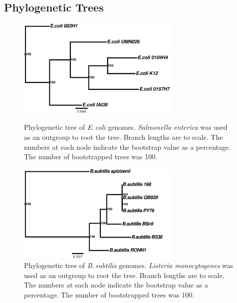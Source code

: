 \documentclass[11pt]{article}
\newcommand{\salm}{\textit{Salmonella enterica}\xspace}
\newcommand{\ecol}{\textit{E.\,coli}\xspace}
\newcommand{\lis}{\textit{Listeria monocytogenes}\xspace}
\newcommand{\bass}{\textit{B.\,subtilis}\xspace}
\begin{document}
	\subsection{Phylogenetic Trees}
	\begin{figure}[H]
		\begin{center}
			\includegraphics[width=0.7\textwidth]{./figs/ecoli_chrom_superseq_all_blocks_branchlengths_rooted_outtree.pdf}
			\caption{\label{fig:ecolitree} Phylogenetic tree of \ecol genomes. \salm was used as an outgroup to root the tree. Branch lengths are to scale. The numbers at each node indicate the bootstrap value as a percentage. The number of bootstrapped trees was 100.}
		\end{center}
	\vspace*{\floatsep}%
	
		\begin{center}
			\includegraphics[width=0.7\textwidth]{./figs/bacillus_chrom_superseq_all_blocks_branchlengths_rooted_outtree.pdf}
			\caption{\label{fig:basstree} Phylogenetic tree of \bass genomes. \lis was used as an outgroup to root the tree. Branch lengths are to scale. The numbers at each node indicate the bootstrap value as a percentage. The number of bootstrapped trees was 100.}
		\end{center}
			
		\end{figure}
		
\end{document}
